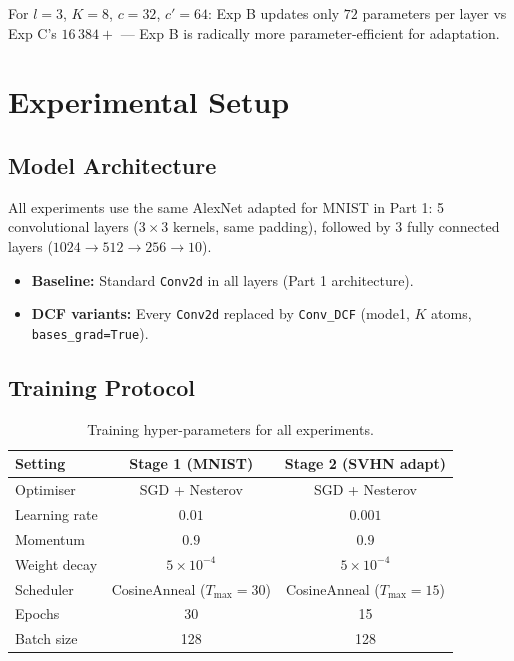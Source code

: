 \documentclass[11pt,letterpaper]{article}
\begin{document}
For $l=3$, $K=8$, $c=32$, $c'=64$: Exp B updates only $72$ parameters per
layer vs Exp C's $16\,384+$ — Exp B is radically more parameter-efficient
for adaptation.

\section{Experimental Setup}
\label{sec:setup}

\subsection{Model Architecture}

All experiments use the same AlexNet adapted for MNIST in Part 1:
5 convolutional layers ($3{\times}3$ kernels, same padding), followed by
3 fully connected layers ($1024 \to 512 \to 256 \to 10$).

\begin{itemize}
  \item \textbf{Baseline:} Standard \texttt{Conv2d} in all layers (Part 1 architecture).
  \item \textbf{DCF variants:} Every \texttt{Conv2d} replaced by
        \texttt{Conv\_DCF} (mode1, $K$ atoms, \texttt{bases\_grad=True}).
\end{itemize}

\subsection{Training Protocol}

\begin{table}[h]
\centering
\caption{Training hyper-parameters for all experiments.}
\label{tab:hparams}
\begin{tabular}{lcc}
\toprule
Setting & Stage 1 (MNIST) & Stage 2 (SVHN adapt) \\
\midrule
Optimiser     & SGD + Nesterov & SGD + Nesterov \\
Learning rate & $0.01$         & $0.001$ \\
Momentum      & $0.9$          & $0.9$ \\
Weight decay  & $5\times10^{-4}$ & $5\times10^{-4}$ \\
Scheduler     & CosineAnneal ($T_\text{max}=30$) & CosineAnneal ($T_\text{max}=15$) \\
Epochs        & 30             & 15 \\
Batch size    & 128            & 128 \\
\bottomrule
\end{tabular}
\end{table}
\end{document}
